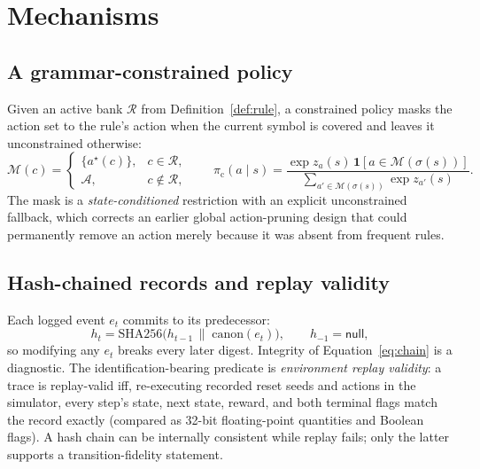 \documentclass[11pt]{article}
\newcommand{\sest}{\sigma}
\newcommand{\Mset}{\mathcal{M}}
\newcommand{\Rules}{\mathcal{R}}
\newcommand{\zero}{\mathsf{null}}
\begin{document}
\section{Mechanisms}
\label{sec:mechanisms}

\subsection{A grammar-constrained policy}
Given an active bank $\Rules$ from Definition~\ref{def:rule}, a constrained policy masks the
action set to the rule's action when the current symbol is covered and leaves it unconstrained
otherwise:
\begin{equation}
\Mset(c)=\begin{cases}\{a^{\star}(c)\}, & c\in\Rules,\\[2pt]\mathcal{A}, & c\notin\Rules,\end{cases}
\qquad
\pi_{\mathrm{c}}(a\mid s)=\frac{\exp z_{a}(s)\,\mathbf{1}[a\in \Mset(\sest(s))]}
{\sum_{a'\in\Mset(\sest(s))}\exp z_{a'}(s)} .
\label{eq:constrained}
\end{equation}
The mask is a \emph{state-conditioned} restriction with an explicit unconstrained fallback, which
corrects an earlier global action-pruning design that could permanently remove an action merely
because it was absent from frequent rules.

\subsection{Hash-chained records and replay validity}
\label{sec:replaymech}
Each logged event $e_t$ commits to its predecessor:
\begin{equation}
h_t=\mathrm{SHA256}\!\big(h_{t-1}\,\|\;\mathrm{canon}(e_t)\big),\qquad h_{-1}=\zero,
\label{eq:chain}
\end{equation}
so modifying any $e_t$ breaks every later digest. Integrity of Equation~\eqref{eq:chain} is a
diagnostic. The identification-bearing predicate is \emph{environment replay validity}: a trace
is replay-valid iff, re-executing recorded reset seeds and actions in the simulator, every step's
state, next state, reward, and both terminal flags match the record exactly (compared as
32-bit floating-point quantities and Boolean flags). A hash chain can be internally consistent
while replay fails; only the latter supports a transition-fidelity statement.
\end{document}
